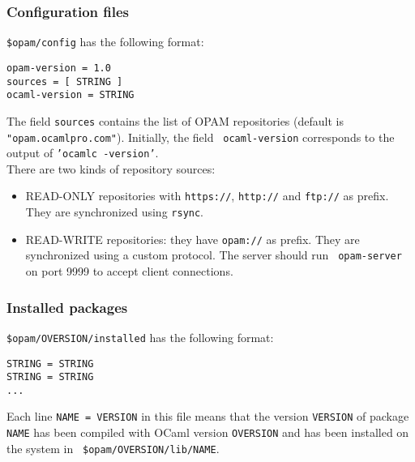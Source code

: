 \documentclass[a4paper,11pt]{article}
\begin{document}
\subsubsection{Configuration files}
\label{config}

{\tt \$opam/config} has the following format:

\begin{verbatim}
opam-version = 1.0
sources = [ STRING ]
ocaml-version = STRING
\end{verbatim}

The field {\tt sources} contains the list of OPAM repositories
(default is {\tt "opam.ocamlpro.com"}). Initially, the field {\tt
  ocaml-version} corresponds to the output of {\tt 'ocamlc
  -version'}. \\

There are two kinds of repository sources:

\begin{itemize}

\item READ-ONLY repositories with {\tt https://}, {\tt http://} and
  {\tt ftp://} as prefix. They are synchronized using {\tt rsync}.

\item READ-WRITE repositories: they have {\tt opam://} as prefix. They
  are synchronized using a custom protocol. The server should run {\tt
    opam-server} on port 9999 to accept client connections.


\end{itemize}

\subsubsection{Installed packages}
\label{installed}

{\tt \$opam/OVERSION/installed} has the following format:

\begin{verbatim}
STRING = STRING
STRING = STRING
...
\end{verbatim}

Each line \verb+NAME = VERSION+ in this file means that the version
{\tt VERSION} of package {\tt NAME} has been compiled with OCaml
version {\tt OVERSION} and has been installed on the system in {\tt
  \$opam/OVERSION/lib/NAME}.
\end{document}
